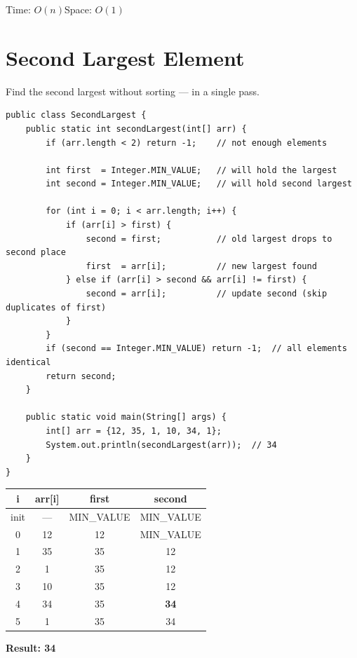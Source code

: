 \documentclass[12pt,a4paper,oneside]{book}
\begin{document}
\begin{complexity}
Time: $O(n)$\quad Space: $O(1)$
\end{complexity}

\section{Second Largest Element}

Find the second largest without sorting --- in a single pass.

\begin{lstlisting}[caption={Second Largest --- Single Pass $O(n)$}]
public class SecondLargest {
    public static int secondLargest(int[] arr) {
        if (arr.length < 2) return -1;    // not enough elements

        int first  = Integer.MIN_VALUE;   // will hold the largest
        int second = Integer.MIN_VALUE;   // will hold second largest

        for (int i = 0; i < arr.length; i++) {
            if (arr[i] > first) {
                second = first;           // old largest drops to second place
                first  = arr[i];          // new largest found
            } else if (arr[i] > second && arr[i] != first) {
                second = arr[i];          // update second (skip duplicates of first)
            }
        }
        if (second == Integer.MIN_VALUE) return -1;  // all elements identical
        return second;
    }

    public static void main(String[] args) {
        int[] arr = {12, 35, 1, 10, 34, 1};
        System.out.println(secondLargest(arr));  // 34
    }
}
\end{lstlisting}

\begin{dryrun}[Dry Run: arr = \{12, 35, 1, 10, 34, 1\}]
\begin{center}
\begin{tabular}{cccc}
\toprule
\textbf{i} & \textbf{arr[i]} & \textbf{first} & \textbf{second}\\
\midrule
init & ---& MIN\_VALUE & MIN\_VALUE\\
0    & 12 & 12         & MIN\_VALUE\\
1    & 35 & 35         & 12\\
2    & 1  & 35         & 12\\
3    & 10 & 35         & 12\\
4    & 34 & 35         & \textbf{34}\\
5    & 1  & 35         & 34\\
\bottomrule
\end{tabular}
\end{center}
\textbf{Result: 34}
\end{dryrun}
\end{document}
